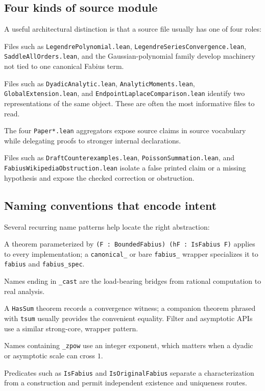 \documentclass[11pt,oneside]{article}
\theoremstyle{definition}
\theoremstyle{remark}
\begin{document}
\subsection{Four kinds of source module}
A useful architectural distinction is that a source file usually has one of
four roles:
\begin{description}[style=nextline,leftmargin=2.8em]
  \item[Reusable infrastructure.] Files such as \nolinkurl{LegendrePolynomial.lean},
  \nolinkurl{LegendreSeriesConvergence.lean}, \nolinkurl{SaddleAllOrders.lean}, and the
  Gaussian-polynomial family develop machinery not tied to one canonical
  Fabius term.
  \item[Fabius-specific bridges.] Files such as \nolinkurl{DyadicAnalytic.lean},
  \nolinkurl{AnalyticMoments.lean}, \nolinkurl{GlobalExtension.lean}, and
  \nolinkurl{EndpointLaplaceComparison.lean} identify two representations of the
  same object.  These are often the most informative files to read.
  \item[Paper-facing façades.] The four \nolinkurl{Paper*.lean} aggregators expose
  source claims in source vocabulary while delegating proofs to stronger
  internal declarations.
  \item[Audit and correction modules.] Files such as
  \nolinkurl{DraftCounterexamples.lean}, \nolinkurl{PoissonSummation.lean}, and
  \nolinkurl{FabiusWikipediaObstruction.lean} isolate a false printed claim or a
  missing hypothesis and expose the checked correction or obstruction.
\end{description}

\subsection{Naming conventions that encode intent}
Several recurring name patterns help locate the right abstraction:
\begin{description}[style=nextline,leftmargin=2.8em]
  \item[Generic versus canonical.] A theorem parameterized by
  \nolinkurl{(F : BoundedFabius) (hF : IsFabius F)} applies to every implementation;
  a \nolinkurl{canonical_} or bare \nolinkurl{fabius_} wrapper specializes it to
  \nolinkurl{fabius} and \nolinkurl{fabius_spec}.
  \item[Exact-to-analytic casts.] Names ending in \nolinkurl{_cast} are the
  load-bearing bridges from rational computation to real analysis.
  \item[Convergence forms.] A \nolinkurl{HasSum} theorem records a convergence
  witness; a companion theorem phrased with \nolinkurl{tsum} usually provides the
  convenient equality.  Filter and asymptotic APIs use a similar strong-core,
  wrapper pattern.
  \item[Integer scales.] Names containing \nolinkurl{_zpow} use an integer exponent,
  which matters when a dyadic or asymptotic scale can cross \(1\).
  \item[Specifications.] Predicates such as \nolinkurl{IsFabius} and
  \nolinkurl{IsOriginalFabius} separate a characterization from a construction and
  permit independent existence and uniqueness routes.
\end{description}
\end{document}
